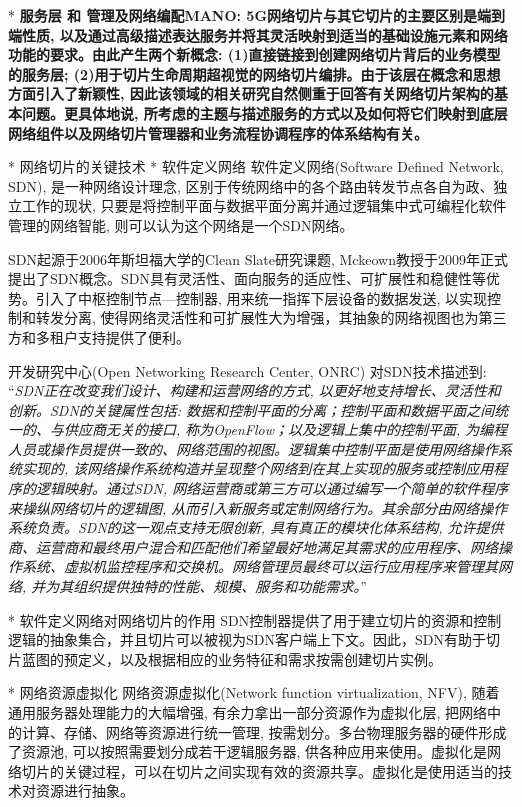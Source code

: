 	* \bf{服务层 和 管理及网络编配MANO}: 5G网络切片与其它切片的主要区别是端到端性质, 以及通过高级描述表达服务并将其灵活映射到适当的基础设施元素和网络功能的要求。由此产生两个新概念: (1)直接链接到创建网络切片背后的业务模型的服务层; (2)用于切片生命周期超视觉的网络切片编排。由于该层在概念和思想方面引入了新颖性, 因此该领域的相关研究自然侧重于回答有关网络切片架构的基本问题。更具体地说, 所考虑的主题与描述服务的方式以及如何将它们映射到底层网络组件以及网络切片管理器和业务流程协调程序的体系结构有关。
	

	
* 网络切片的关键技术
	* 软件定义网络
		软件定义网络(Software Defined Network, SDN), 是一种网络设计理念, 区别于传统网络中的各个路由转发节点各自为政、独立工作的现状, 只要是将控制平面与数据平面分离并通过逻辑集中式可编程化软件管理的网络智能, 则可以认为这个网络是一个SDN网络。
		
		SDN起源于2006年斯坦福大学的Clean Slate研究课题, Mckeown教授于2009年正式提出了SDN概念。SDN具有灵活性、面向服务的适应性、可扩展性和稳健性等优势。引入了中枢控制节点---控制器, 用来统一指挥下层设备的数据发送, 以实现控制和转发分离, 使得网络灵活性和可扩展性大为增强，其抽象的网络视图也为第三方和多租户支持提供了便利。

		开发研究中心(Open Networking Research Center, ONRC) 对SDN技术描述到:  “\textit{SDN正在改变我们设计、构建和运营网络的方式, 以更好地支持增长、灵活性和创新。SDN的关键属性包括: 数据和控制平面的分离；控制平面和数据平面之间统一的、与供应商无关的接口, 称为OpenFlow；以及逻辑上集中的控制平面, 为编程人员或操作员提供一致的、网络范围的视图。逻辑集中控制平面是使用网络操作系统实现的, 该网络操作系统构造并呈现整个网络到在其上实现的服务或控制应用程序的逻辑映射。通过SDN, 网络运营商或第三方可以通过编写一个简单的软件程序来操纵网络切片的逻辑图, 从而引入新服务或定制网络行为。其余部分由网络操作系统负责。SDN的这一观点支持无限创新, 具有真正的模块化体系结构, 允许提供商、运营商和最终用户混合和匹配他们希望最好地满足其需求的应用程序、网络操作系统、虚拟机监控程序和交换机。网络管理员最终可以运行应用程序来管理其网络, 并为其组织提供独特的性能、规模、服务和功能需求。}”

		* 软件定义网络对网络切片的作用
			SDN控制器提供了用于建立切片的资源和控制逻辑的抽象集合，并且切片可以被视为SDN客户端上下文。因此，SDN有助于切片蓝图的预定义，以及根据相应的业务特征和需求按需创建切片实例。
	
	* 网络资源虚拟化
		网络资源虚拟化(Network function virtualization, NFV), 随着通用服务器处理能力的大幅增强, 有余力拿出一部分资源作为虚拟化层, 把网络中的计算、存储、网络等资源进行统一管理, 按需划分。多台物理服务器的硬件形成了资源池, 可以按照需要划分成若干逻辑服务器, 供各种应用来使用。虚拟化是网络切片的关键过程，可以在切片之间实现有效的资源共享。虚拟化是使用适当的技术对资源进行抽象。

